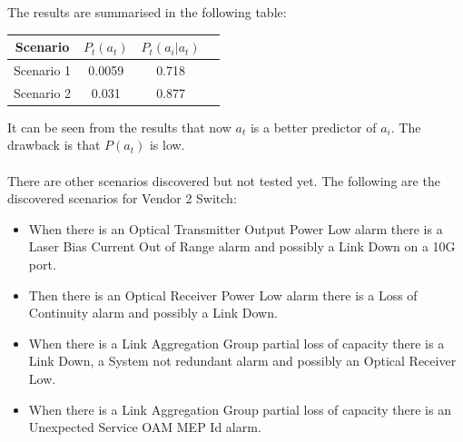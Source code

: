 \documentclass[10pt,a4paper]{article}
\begin{document}
The results are summarised in the following table: 

\begin{center}
 \begin{tabular}{||c | c | c | c ||} 
 \hline\hline
 Scenario  & $P_t(a_t)$ & $P_t(a_i|a_t)$ \\ 
 \hline
 Scenario 1& 0.0059 & 0.718 \\  
 \hline
 Scenario 2 & 0.031 & 0.877 \\  

 \hline\hline
\end{tabular}
\end{center}

It can be seen from the results that now $a_t$ is a better predictor of $a_i$. The drawback is that $P(a_t)$ is low.
\\\\
There are other scenarios discovered but not tested yet. The following are the discovered scenarios for Vendor 2 Switch:

\begin{itemize}
\item When there is an Optical Transmitter Output Power Low alarm there is a Laser Bias Current Out of Range alarm and possibly a Link Down on a 10G port.
\item Then there is an Optical Receiver Power Low alarm there is a Loss of Continuity alarm and possibly a Link Down.
\item When there is a Link Aggregation Group partial loss of capacity there is a Link Down, a System not redundant alarm and possibly an Optical Receiver Low.
\item When there is a Link Aggregation Group partial loss of capacity there is an Unexpected Service OAM MEP Id alarm.
\end{itemize}
\end{document}
